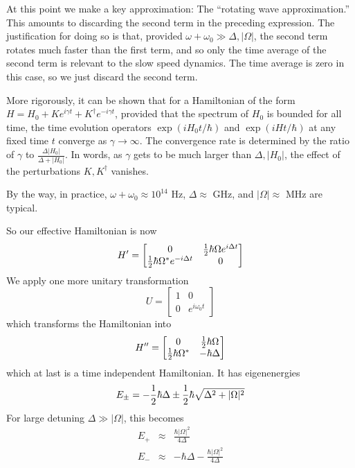 \documentclass[aps,prb,floatfix,amsmath,amssymb,groupedaddress]{revtex4}
\begin{document}
At this point we make a key approximation: The ``rotating wave approximation.''  This amounts to discarding the second term in the preceding expression.  The justification for doing so is that, provided $\omega + \omega_0 \gg \Delta, |\Omega|$, the second term rotates much faster than the first term, and so only the time average of the second term is relevant to the slow speed dynamics.  The time average is zero in this case, so we just discard the second term.  

More rigorously, it can be shown that for a Hamiltonian of the form $H = H_0 + K e^{i \gamma t} + K^\dagger e^{-i \gamma t}$, provided that the spectrum of $H_0$ is bounded for all time, the time evolution operators $\exp(iH_0 t/\hbar)$ and $\exp(iHt/\hbar)$ at any fixed time $t$ converge as $\gamma\rightarrow \infty$.  The convergence rate is determined by the ratio of $\gamma$ to $\frac{\Delta |H_0|}{\Delta + |H_0|}$.  In words, as $\gamma$ gets to be much larger than $\Delta, |H_0|$, the effect of the perturbations $K, K^\dagger$ vanishes. 

By the way, in practice, $\omega+\omega_0 \approx 10^{14}$ Hz, $\Delta\approx $ GHz, and $|\Omega|\approx$ MHz are typical.  

So our effective Hamiltonian is now $$H' = 
\begin{bmatrix}
0 & {\frac{1}{2}} \hbar\Omega e^{i\Delta t} \\
{\frac{1}{2}}\hbar \Omega^* e^{-i\Delta t} & 0
\end{bmatrix}
$$
We apply one more unitary transformation $$U = 
\begin{bmatrix}
1 & 0 \\
0 & e^{i\omega_0 t}
\end{bmatrix}
$$ 
which transforms the Hamiltonian into $$H'' = 
\begin{bmatrix}
0 & {\frac{1}{2}} \hbar\Omega \\
{\frac{1}{2}} \hbar \Omega^* & -\hbar\Delta
\end{bmatrix}
$$ 
which at last is a time independent Hamiltonian.  It has eigenenergies
\begin{equation}
E_{\pm} = -{\frac{1}{2}} \hbar \Delta \pm {\frac{1}{2}} \hbar \sqrt{\Delta^2 + |\Omega|^2}
\label{eigs}
\end{equation}
For large detuning $\Delta \gg |\Omega|$, this becomes
\begin{eqnarray}
E_+ & \approx & \frac{\hbar |\Omega|^2}{4\Delta} \\ \nonumber
E_- & \approx & -\hbar \Delta - \frac{\hbar |\Omega|^2}{4\Delta}
\end{eqnarray}
\end{document}
